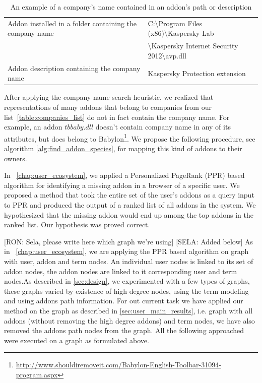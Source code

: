 \documentclass[11pt,oneside]{book}
\begin{document}
\begin{table}[h]
\centering
\caption{An example of a company's name contained in an addon's path or description}
\label{table:addon_desc}
\begin{tabular}{@{}|l|l|@{}}
\toprule
Addon installed in a folder containing the company name & C:\textbackslash{Program Files (x86)}\textbackslash{Kaspersky Lab}\\ & \textbackslash{Kaspersky Internet Security 2012}\textbackslash{avp.dll} \\ \midrule
Addon description containing the company name & Kaspersky Protection extension \\ \bottomrule
\end{tabular}
\end{table}

After applying the company name search heuristic, we realized that representations of many addons that belong to companies from our list~\autoref{table:companies_list} do not in fact contain the company name. For example, an addon $tbbaby.dll$ doesn't contain company name in any of its attributes, but does belong to Babylon\footnote{\url{http://www.shouldiremoveit.com/Babylon-English-Toolbar-31094-program.aspx}}. 
We propose the following procedure, see algorithm \autoref{alg:find_addon_species}, for mapping this kind of addons to their owners. 

In ~\autoref{chap:user_ecosystem}, we applied a Personalized PageRank (PPR) based algorithm for identifying a missing addon in a browser of a specific user. We proposed a method that took the entire set of the user's addons as a query input to PPR and produced the output of a ranked list of all addons in the system. We hypothesized that the missing addon would end up among the top addons in the ranked list. Our hypothesis was proved correct.

[RON: Sela, please write here which graph we're using]
[SELA: Added below]
As in ~\autoref{chap:user_ecosystem}, we are applying the PPR based algorithm on graph with user, addon and term nodes. An individual user nodes is linked to its set of addon nodes, the addon nodes are linked to it corresponding user and term nodes.As described in \autoref{sec:design}, we experimented with a few types of graphs, these graphs varied by existence of high degree nodes, using the term modeling and using addons path information. For out current task we have applied our method on the graph as described in \autoref{sec:user_main_results}, i.e. graph with all addons (without removing the high degree addons) and term nodes, we have also removed the addons path nodes from the graph. All the following approached were executed on a graph as formulated above.
\end{document}
